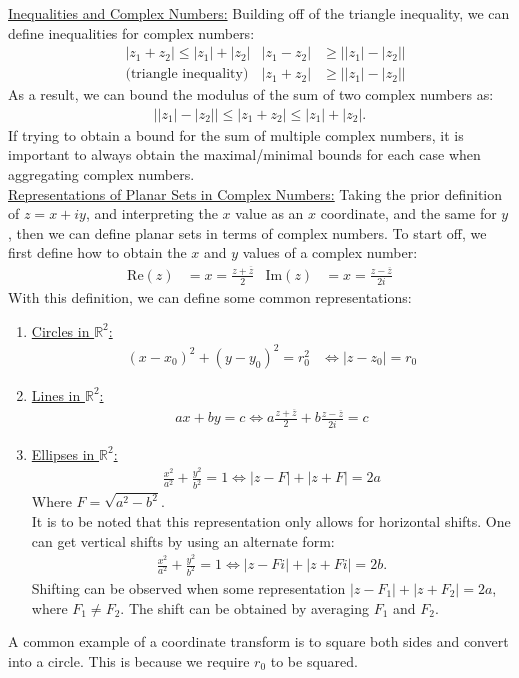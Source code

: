 \documentclass{article}
\newcommand{\gap}{\medskip\\}
\newcommand{\sheader}[1]{\underline{#1:}}
\begin{document}
    \sheader{Inequalities and Complex Numbers}
    Building off of the triangle inequality, we can define inequalities 
    for complex numbers:
    \begin{align*}
        &|z_1 + z_2| \leq |z_1| + |z_2| &|z_1 - z_2| &\geq \left||z_1| - |z_2|\right|\\
        &\textrm{(triangle inequality)} &|z_1 + z_2| &\geq \left| |z_1| - |z_2| \right|
    \end{align*}
    As a result, we can bound the modulus of the sum of two complex numbers as:
    \begin{align*}
        \left| |z_1| - |z_2| \right| \leq |z_1 + z_2| \leq |z_1| + |z_2|.
    \end{align*}
    If trying to obtain a bound for the sum of multiple complex numbers, it is important
    to always obtain the maximal/minimal bounds for each case when aggregating 
    complex numbers.
    \gap
    \sheader{Representations of Planar Sets in Complex Numbers} Taking the 
    prior definition of $z = x + iy$, and interpreting the $x$ value as an $x$ coordinate,
    and the same for $y$, then we can define planar sets in terms of complex numbers.
    To start off, we first define how to obtain the $x$ and $y$ values of a complex number:
    \begin{align*}
        \textrm{Re}(z) &= x = \frac{z + \overline{z}}{2} & \textrm{Im}(z) &= x = \frac{z - \overline{z}}{2i}
    \end{align*}
    With this definition, we can define some common representations:
    \begin{enumerate}
        \item \sheader{Circles in $\mathbb{R}^2$} 
        \begin{align*}
            (x - x_0)^2 + (y - y_0)^2 = r_0^2 &\iff |z - z_0| = r_0
        \end{align*}
        \item \sheader{Lines in $\mathbb{R}^2$}
        \begin{align*}
            ax + by = c \iff a \frac{z + \overline{z}}{2} + b \frac{z - \overline{z}}{2i} = c
        \end{align*}
        \item \sheader{Ellipses in $\mathbb{R}^2$}
        \begin{align*}
            \frac{x^2}{a^2} + \frac{y^2}{b^2} = 1 \iff |z - F| + |z + F| = 2a 
        \end{align*}
        Where $F = \sqrt{a^2 - b^2}$. 
        \gap
        It is to be noted that this representation only allows for horizontal shifts.
        One can get vertical shifts by using an alternate form:
        \begin{align*}
            \frac{x^2}{a^2} + \frac{y^2}{b^2} = 1 \iff |z - Fi| + |z + Fi| = 2b.
        \end{align*}
        Shifting can be observed when some representation $|z - F_1| + |z + F_2| = 2a$,
        where $F_1 \neq F_2$. The shift can be obtained by averaging $F_1$ and $F_2$. 
    \end{enumerate}
    A common example of a coordinate transform is to square both sides and convert 
    into a circle. This is because we require $r_0$ to be squared.
    \gap
    
\end{document}

